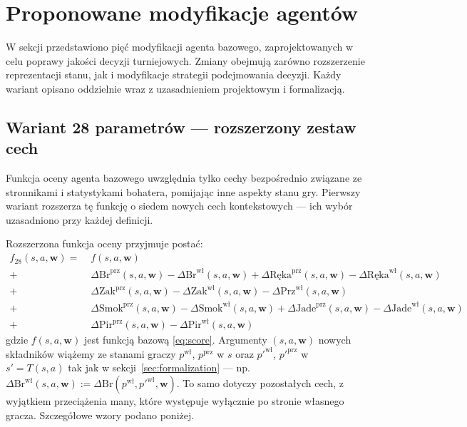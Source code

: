 \section{Proponowane modyfikacje agentów} \label{sec:modifications}

W sekcji przedstawiono pięć modyfikacji agenta bazowego, zaprojektowanych w celu poprawy jakości decyzji turniejowych. Zmiany obejmują zarówno rozszerzenie reprezentacji stanu, jak i modyfikacje strategii podejmowania decyzji. Każdy wariant opisano oddzielnie wraz z uzasadnieniem projektowym i formalizacją.

\subsection{Wariant 28 parametrów --- rozszerzony zestaw cech}
\label{sec:agent28}

Funkcja oceny agenta bazowego uwzględnia tylko cechy bezpośrednio związane ze stronnikami i statystykami bohatera, pomijając inne aspekty stanu gry. Pierwszy wariant rozszerza tę funkcję o siedem nowych cech kontekstowych --- ich wybór uzasadniono przy każdej definicji.

Rozszerzona funkcja oceny przyjmuje postać:
\begin{equation}
\begin{split}
    f_{28}(s, a, \mathbf{w}) =\;&
        f(s, a, \mathbf{w}) \\
        +\;& \Delta \text{Br}^{\text{prz}}(s,a,\mathbf{w}) - \Delta \text{Br}^{\text{wł}}(s,a,\mathbf{w})
        + \Delta \text{Ręka}^{\text{prz}}(s,a,\mathbf{w}) - \Delta \text{Ręka}^{\text{wł}}(s,a,\mathbf{w}) \\
        +\;& \Delta \text{Zak}^{\text{prz}}(s,a,\mathbf{w}) - \Delta \text{Zak}^{\text{wł}}(s,a,\mathbf{w})
        - \Delta \text{Prz}^{\text{wł}}(s,a,\mathbf{w}) \\
        +\;& \Delta \text{Smok}^{\text{prz}}(s,a,\mathbf{w}) - \Delta \text{Smok}^{\text{wł}}(s,a,\mathbf{w})
        + \Delta \text{Jade}^{\text{prz}}(s,a,\mathbf{w}) - \Delta \text{Jade}^{\text{wł}}(s,a,\mathbf{w}) \\
        +\;& \Delta \text{Pir}^{\text{prz}}(s,a,\mathbf{w}) - \Delta \text{Pir}^{\text{wł}}(s,a,\mathbf{w})
\end{split}
    \label{eq:score28}
\end{equation}
gdzie $f(s, a, \mathbf{w})$ jest funkcją bazową \eqref{eq:score}. Argumenty $(s,a,\mathbf{w})$ nowych składników wiążemy ze stanami graczy $p^{\text{wł}}$, $p^{\text{prz}}$ w $s$ oraz $p'^{\text{wł}}$, $p'^{\text{prz}}$ w $s'=T(s,a)$ tak jak w sekcji~\ref{sec:formalization} --- np.\ $\Delta\text{Br}^{\text{wł}}(s,a,\mathbf{w}) := \Delta\text{Br}(p^{\text{wł}}, p'^{\text{wł}}, \mathbf{w})$. To samo dotyczy pozostałych cech, z wyjątkiem przeciążenia many, które występuje wyłącznie po stronie własnego gracza. Szczegółowe wzory podano poniżej.

